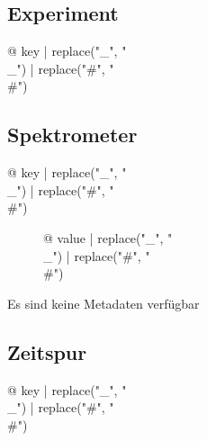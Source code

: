 \begin{multicols}{2}
\subsection{Experiment}

\begin{description}
\item[{@ key | replace("_", "\\_") | replace("#", "\\#") }] %
\end{description}

\subsection{Spektrometer}

\begin{description}
\item[{@ key | replace("_", "\\_") | replace("#", "\\#") }] {@ value | replace("_", "\\_") | replace("#", "\\#") }
\end{description}
Es sind keine Metadaten verfügbar

\subsection{Zeitspur}

\begin{description}
\item[{@ key | replace("_", "\\_") | replace("#", "\\#") }] %
\end{description}


\end{multicols}
